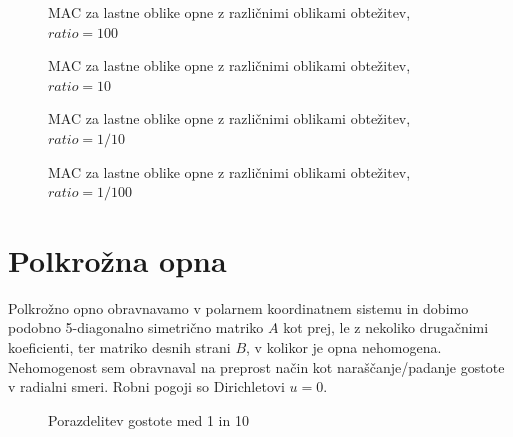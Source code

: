 \begin{figure}[H]
    \centering
    \caption{MAC za lastne oblike opne z različnimi oblikami obtežitev, $ratio=100$}
\end{figure}
\begin{figure}[H]
    \centering
    \caption{MAC za lastne oblike opne z različnimi oblikami obtežitev, $ratio=10$}
\end{figure}
\begin{figure}[H]
    \centering
    \caption{MAC za lastne oblike opne z različnimi oblikami obtežitev, $ratio=1/10$}
\end{figure}
\begin{figure}[H]
    \centering
    \caption{MAC za lastne oblike opne z različnimi oblikami obtežitev, $ratio=1/100$}
\end{figure}

\section{Polkrožna opna}

Polkrožno opno obravnavamo v polarnem koordinatnem sistemu in dobimo podobno 5-diagonalno simetrično matriko $A$ kot prej, le z nekoliko drugačnimi koeficienti, ter matriko desnih strani $B$, v kolikor je opna nehomogena. Nehomogenost sem obravnaval na preprost način kot naraščanje/padanje gostote v radialni smeri. Robni pogoji so Dirichletovi $u=0$.

\begin{figure}[H]
    \centering
    \caption{Porazdelitev gostote med 1 in 10}
\end{figure}

